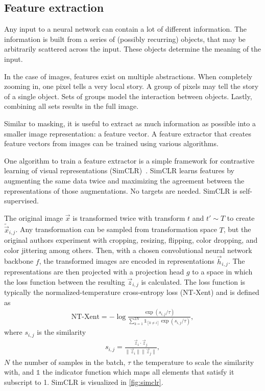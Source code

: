 \subsection{Feature extraction}

Any input to a neural network can contain a lot of different information.
The information is built from a series of (possibly recurring) objects, that may be arbitrarily scattered across the input.
These objects determine the meaning of the input.

In the case of images, features exist on multiple abstractions.
When completely zooming in, one pixel tells a very local story.
A group of pixels may tell the story of a single object.
Sets of groups model the interaction between objects.
Lastly, combining all sets results in the full image.

Similar to masking, it is useful to extract as much information as possible into a smaller image representation: a feature vector.
A feature extractor that creates feature vectors from images can be trained using various algorithms.

One algorithm to train a feature extractor is a simple framework for contrastive learning of visual representations (SimCLR)~\cite{Chen2020}.
SimCLR learns features by augmenting the same data twice and maximizing the agreement between the representations of those augmentations.
No targets are needed.
SimCLR is self-supervised.

The original image $\vec{x}$ is transformed twice with transform $t$ and $t' \sim T$ to create $\tilde{\vec{x}}_{i,j}$.
Any transformation can be sampled from transformation space $T$, but the original authors experiment with cropping, resizing, flipping, color dropping, and color jittering among others.
Then, with a chosen convolutional neural network backbone $f$, the transformed images are encoded in representations $\vec{h}_{i,j}$.
The representations are then projected with a projection head $g$ to a space in which the loss function between the resulting $\vec{z}_{i,j}$ is calculated.
The loss function is typically the normalized-temperature cross-entropy loss (NT-Xent) and is defined as
\begin{align}
    \text{NT-Xent} = - \log \frac{\exp(s_{i,j} / \tau)}{\sum_{k=1}^{2N}\mathbb{1}_{[k\neq i]}\exp(s_{i,j} / \tau)},
\end{align}
where $s_{i,j}$ is the similarity
\begin{align}
    s_{i,j} = \frac{\vec{z}_i \cdot \vec{z}_j }{\|\vec{z}_i\|\|\vec{z}_j\|},
\end{align}
$N$ the number of samples in the batch, $\tau$ the temperature to scale the similarity with, and $\mathbb{1}$ the indicator function which maps all elements that satisfy it subscript to 1.
SimCLR is visualized in \cref{fig:simclr}.



